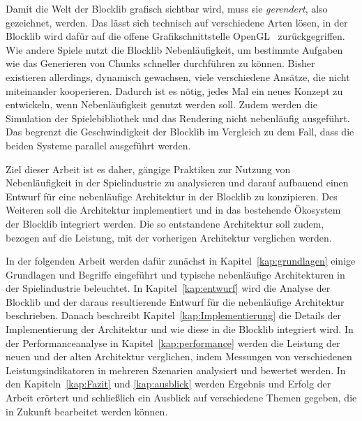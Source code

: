 Damit die Welt der Blocklib grafisch sichtbar wird, muss sie \emph{gerendert}, also gezeichnet, werden. Das lässt sich technisch auf verschiedene Arten lösen, in der Blocklib wird dafür auf die offene Grafikschnittstelle OpenGL~\cite{TheKhronosGroup,Vries2020} zurückgegriffen. Wie andere Spiele nutzt die Blocklib Nebenläufigkeit, um bestimmte Aufgaben wie das Generieren von Chunks schneller durchführen zu können. Bisher existieren allerdings, dynamisch gewachsen, viele verschiedene Ansätze, die nicht miteinander kooperieren. Dadurch ist es nötig, jedes Mal ein neues Konzept zu entwickeln, wenn Nebenläufigkeit genutzt werden soll. Zudem werden die Simulation der Spielebibliothek und das Rendering nicht nebenläufig ausgeführt. Das begrenzt die Geschwindigkeit der Blocklib im Vergleich zu dem Fall, dass die beiden Systeme parallel ausgeführt werden.

Ziel dieser Arbeit ist es daher, gängige Praktiken zur Nutzung von Nebenläufigkeit in der Spielindustrie zu analysieren und darauf aufbauend einen Entwurf für eine nebenläufige Architektur in der Blocklib zu konzipieren. Des Weiteren soll die Architektur implementiert und in das bestehende Ökosystem der Blocklib integriert werden. Die so entstandene Architektur soll zudem, bezogen auf die Leistung, mit der vorherigen Architektur verglichen werden.

In der folgenden Arbeit werden dafür zunächst in Kapitel~\ref{kap:grundlagen} einige Grundlagen und Begriffe eingeführt und typische nebenläufige Architekturen in der Spielindustrie beleuchtet. In Kapitel~\ref{kap:entwurf} wird die Analyse der Blocklib und der daraus resultierende Entwurf für die nebenläufige Architektur beschrieben. Danach beschreibt Kapitel~\ref{kap:Implementierung} die Details der Implementierung der Architektur und wie diese in die Blocklib integriert wird. In der Performanceanalyse in Kapitel~\ref{kap:performance} werden die Leistung der neuen und der alten Architektur verglichen, indem Messungen von verschiedenen Leistungsindikatoren in mehreren Szenarien analysiert und bewertet werden. In den Kapiteln~\ref{kap:Fazit} und \ref{kap:ausblick} werden Ergebnis und Erfolg der Arbeit erörtert und schließlich ein Ausblick auf verschiedene Themen gegeben, die in Zukunft bearbeitet werden können.